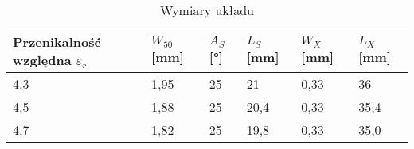 \begin{table}[H]
\centering
\caption{Wymiary układu}
\label{TabWymiary}
\small
\begin{tabularx}{\textwidth}{ |X|X|X|X|X|X|}
\hline
Przenikalność względna $\varepsilon_r$ & $W_{50}$ [mm] & $A_{S}$ [°]& $L_S$ [mm]& $W_X$ [mm] & $L_X$ [mm] \\
  \hline
4,3 & 1,95 & 25 & 21 & 0,33 & 36\\
  \hline
4,5 & 1,88 & 25 & 20,4  & 0,33 & 35,4\\
  \hline
4,7 & 1,82 & 25 & 19,8 & 0,33 & 35,0\\
\hline
\end{tabularx}
\end{table}